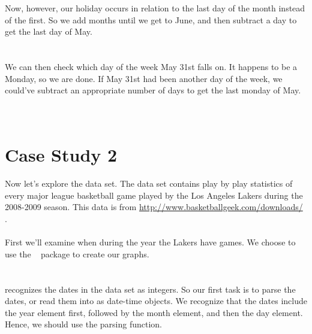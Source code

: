 \documentclass[article]{jss}
\begin{document}
\\
\\

Now, however, our holiday occurs in relation to the last day of the month instead of the first. So we add months until we get to June, and then subtract a day to get the last day of May.\\

\\
\\

We can then check which day of the week May 31st falls on. It happens to be a Monday, so we are done. If May 31st had been another day of the week, we could've subtract an appropriate number of days to get the last monday of May.\\

\\
\\


\section{Case Study 2}
Now let's explore the  data set. The  data set contains play by play statistics of every major league basketball game played by the Los Angeles Lakers during the 2008-2009 season. This data is from \url{http://www.basketballgeek.com/downloads/} \citep{bball}. \\

\\

First we'll examine when during the year the Lakers have games. We choose to use the  ~\citep{ggplot2} package to create our graphs.\\

\\
\\

 recognizes the dates in the  data set as integers. So our first task is to parse the dates, or read them into  as date-time objects. We recognize that the dates include the year element first, followed by the month element, and then the day element. Hence, we should use the  parsing function.\\
\end{document}
